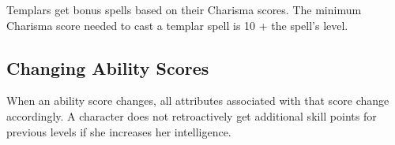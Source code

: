 Templars get bonus spells based on their Charisma scores. The minimum Charisma score needed to cast a templar spell is 10 + the spell's level.

\subsection{Changing Ability Scores}
When an ability score changes, all attributes associated with that score change accordingly. A character does not retroactively get additional skill points for previous levels if she increases her intelligence.
